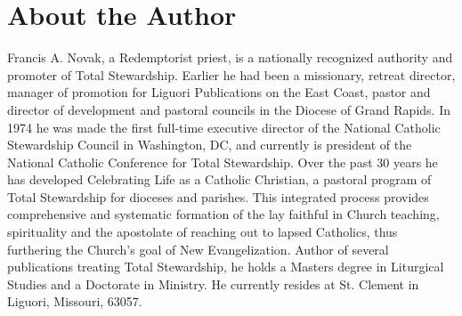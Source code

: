 \documentclass[oneside]{book}
\begin{document}

\chapter{About the Author}

Francis A. Novak, a Redemptorist priest, is a nationally recognized authority
and promoter of Total Stewardship. Earlier he had been a missionary, retreat
director, manager of promotion for Liguori Publications on the East Coast,
pastor and director of development and pastoral councils in the Diocese of Grand
Rapids. In 1974 he was made the first full-time executive director of the
National Catholic Stewardship Council in Washington, DC, and currently is
president of the National Catholic Conference for Total Stewardship. Over the
past 30 years he has developed Celebrating Life as a Catholic Christian, a
pastoral program of Total Stewardship for dioceses and parishes. This integrated
process provides comprehensive and systematic formation of the lay faithful in
Church teaching, spirituality and the apostolate of reaching out to lapsed
Catholics, thus furthering the Church's goal of New Evangelization. Author of
several publications treating Total Stewardship, he holds a Masters degree in
Liturgical Studies and a Doctorate in Ministry. He currently resides at
St. Clement in Liguori, Missouri, 63057.

\end{document}
